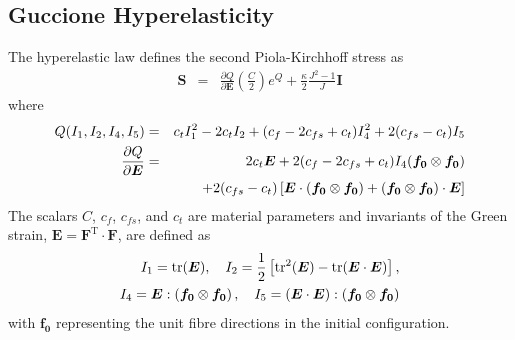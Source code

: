 \documentclass[sn-mathphys,Numbered]{sn-jnl}%
\begin{document}
\begin{appendices}
\subsection{Guccione Hyperelasticity}
%
The \citet{Guccione1995} hyperelastic law defines the second Piola-Kirchhoff stress as
\begin{eqnarray}
	\boldsymbol{S}
		&=& \frac{\partial Q}{\partial \boldsymbol{E} } \left( \frac{C}{2} \right) e^Q + \frac{\kappa}{2} \frac{J^2 - 1}{J} \textbf{I} 
\end{eqnarray}
where
\begin{eqnarray}
	Q(I_1, I_2, I_4, I_5) &=& c_t I_1^2 - 2 c_t I_2 + (c_f - 2c_{fs} + c_t) I_4^2   + 2(c_{fs} - c_t) I_5 \\
	\frac{\partial Q}{\partial \boldsymbol{E} }
		&=&  2 c_t \boldsymbol{E} + 2(c_f - 2 c_{fs} + c_t)I_4 ( \boldsymbol{f_0} \otimes \boldsymbol{f_0} ) \notag \\
		&&+ 2(c_{fs} - c_t)\left[\boldsymbol{E} \cdot  (\boldsymbol{f_0} \otimes \boldsymbol{f_0}) + ( \boldsymbol{f_0} \otimes \boldsymbol{f_0} ) \cdot \boldsymbol{E} \right]
\end{eqnarray}
The scalars $C$, $c_f$, $c_{fs}$, and $c_t$ are material parameters and invariants of the Green strain, $\boldsymbol{E} = \boldsymbol{F}^{\text{T}} \cdot \boldsymbol{F}$, are defined as
\begin{eqnarray}
	I_1 = \text{tr}(\boldsymbol{E}), \quad
	I_2 =  \frac{1}{2} \left[ \text{tr}^2(\boldsymbol{E}) - \text{tr}(\boldsymbol{E} \cdot \boldsymbol{E}) \right], \notag \\
	I_4 = \boldsymbol{E}  : \left( \boldsymbol{f_0} \otimes \boldsymbol{f_0} \right), \quad 
	I_5 = \left( \boldsymbol{E} \cdot \boldsymbol{E} \right): \left( \boldsymbol{f_0} \otimes \boldsymbol{f_0} \right)
\end{eqnarray}
with $\boldsymbol{f_0}$ representing the unit fibre directions in the initial configuration.


\end{appendices}
\end{document}

